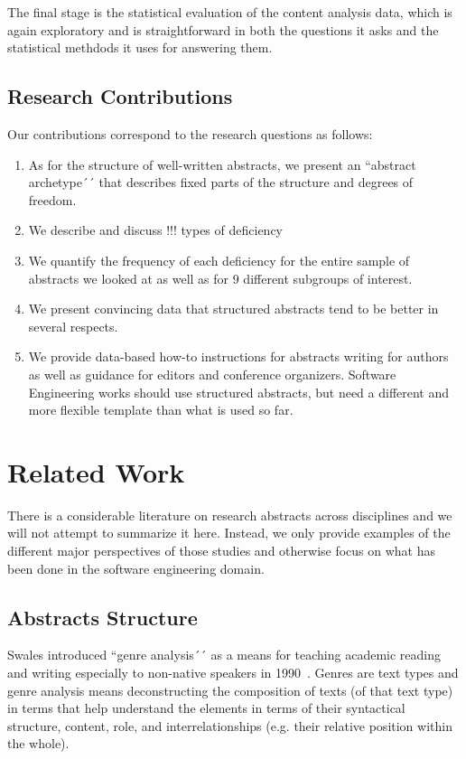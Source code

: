 \documentclass[10pt,journal,compsoc]{IEEEtran}
\begin{document}
The final stage is the statistical evaluation of the content analysis data,
which is again exploratory and is straightforward in both
the questions it asks and the statistical methdods it uses for answering them.


\subsection{Research Contributions}

Our contributions correspond to the research questions as follows:
\begin{enumerate}
	\item As for the structure of well-written abstracts, we present an ``abstract archetype´´
	  that describes fixed parts of the structure and degrees of freedom. 
	\item We describe and discuss !!! types of deficiency 
	\item We quantify the frequency of each deficiency for the entire sample of abstracts
	  we looked at as well as for 9 different subgroups of interest.
	\item We present convincing data that structured abstracts tend to be better 
	  in several respects.
	\item We provide data-based how-to instructions for abstracts writing for authors
	  as well as guidance for editors and conference organizers.
	  Software Engineering works should use structured abstracts, but
	  need a different and more flexible template than what is used so far.
\end{enumerate}


\section{Related Work}

There is a considerable literature on research abstracts across disciplines
and we will not attempt to summarize it here.
Instead, we only provide examples of the different major perspectives of those studies
and otherwise focus on what has been done in the software engineering domain.


\subsection{Abstracts Structure}

Swales introduced ``genre analysis´´ as a means for teaching academic reading and writing
especially to non-native speakers in 1990~\cite{Swales90}.
Genres are text types and genre analysis means deconstructing the composition
of texts (of that text type) in terms that help understand the elements in
terms of their syntactical structure, content, role, and interrelationships
(e.g. their relative position within the whole).
\end{document}
